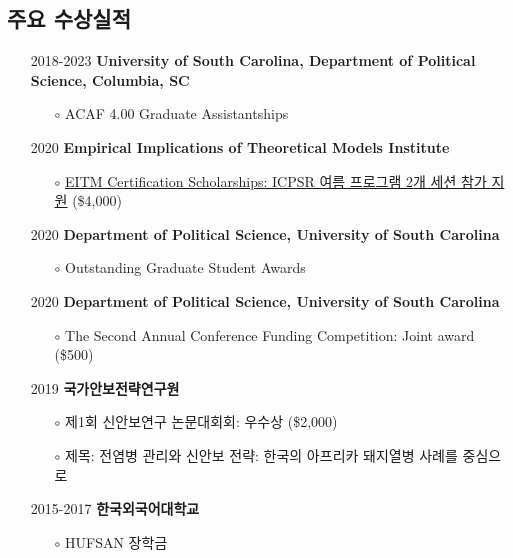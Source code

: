 \documentclass[11pt]{res} %
\begin{document}
\begin{resume}
\begin{itemize}[leftmargin=*]
	\section{주요 수상실적} 
	\begin{itemize}[wide = 0pt] \itemsep -2pt 
		\item[2018-2023] \textbf{University of South Carolina, Department of Political Science, Columbia, SC}
		\begin{itemize} \itemsep -2pt 
			\item[$\circ$] ACAF 4.00 Graduate Assistantships
		\end{itemize} \itemsep -2pt 
		\item[2020] \textbf{Empirical Implications of Theoretical Models Institute}
		\begin{itemize} \itemsep -2pt 
			\item[$\circ$] \href{https://52.2.147.143/icpsrweb/content/sumprog/scholarships/winners-2020.html}{EITM Certification Scholarships: ICPSR 여름 프로그램 2개 세션 참가 지원} (\$4,000)
		\end{itemize} 
		\item[2020] \textbf{Department of Political Science, University of South Carolina}
		\begin{itemize} \itemsep -2pt 
			\item[$\circ$] Outstanding Graduate Student Awards
		\end{itemize} 
		\item[2020] \textbf{Department of Political Science, University of South Carolina}
		\begin{itemize} \itemsep -2pt 
			\item[$\circ$] The Second Annual Conference Funding Competition: Joint award (\$500)
		\end{itemize} 
		\item[2019] \textbf{국가안보전략연구원}
		\begin{itemize} \itemsep -2pt 
			\item[$\circ$] 제1회 신안보연구 논문대회회: 우수상 (\$2,000)
			\item[$\circ$] 제목: 전염병 관리와 신안보 전략: 한국의 아프리카 돼지열병 사례를 중심으로
		\end{itemize}
		\item[2015-2017] \textbf{한국외국어대학교}
		\begin{itemize} \itemsep -2pt 
			\item[$\circ$] HUFSAN 장학금
		\end{itemize}
	\end{itemize}
\end{itemize}

\end{resume}
\end{document}
